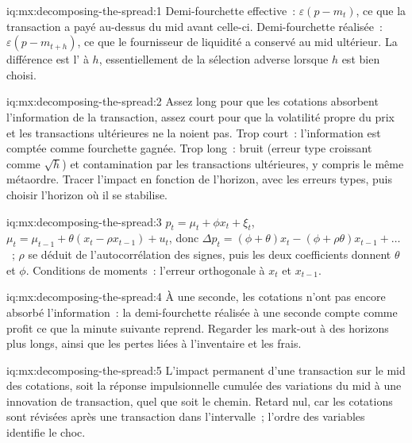 \begin{solution}{iq:mx:decomposing-the-spread:1}
Demi-fourchette effective~: $\varepsilon(p-m_t)$, ce que la transaction a payé au-dessus du mid avant celle-ci. Demi-fourchette réalisée~: $\varepsilon(p-m_{t+h})$, ce que le fournisseur de liquidité a conservé au mid ultérieur. La
différence est l' à $h$, essentiellement de la sélection adverse lorsque $h$ est bien choisi.
\end{solution}

\begin{solution}{iq:mx:decomposing-the-spread:2}
Assez long pour que les cotations absorbent l'information de la transaction, assez court pour que la volatilité propre du prix et les transactions ultérieures ne la noient pas. Trop court~:
l'information est comptée comme fourchette gagnée. Trop long~: bruit (erreur type croissant comme $\sqrt h$) et contamination par les transactions ultérieures, y compris le même
métaordre. Tracer l'impact en fonction de l'horizon, avec les erreurs types, puis choisir l'horizon où il se stabilise.
\end{solution}

\begin{solution}{iq:mx:decomposing-the-spread:3}
$p_t=\mu_t+\phi x_t+\xi_t$, $\mu_t=\mu_{t-1}+\theta(x_t-\rho x_{t-1})+u_t$, donc $\Delta p_t=(\phi+\theta)x_t-(\phi+\rho\theta)x_{t-1}+\dots$~; $\rho$ se déduit de
l'autocorrélation des signes, puis les deux coefficients donnent $\theta$ et $\phi$. Conditions de moments~: l'erreur orthogonale à $x_t$ et $x_{t-1}$.
\end{solution}

\begin{solution}{iq:mx:decomposing-the-spread:4}
À une seconde, les cotations n'ont pas encore absorbé l'information~: la demi-fourchette réalisée à une seconde compte comme profit ce que la minute suivante reprend. Regarder
les mark-out à des horizons plus longs, ainsi que les pertes liées à l'inventaire et les frais.
\end{solution}

\begin{solution}{iq:mx:decomposing-the-spread:5}
L'impact permanent d'une transaction sur le mid des cotations, soit la réponse impulsionnelle cumulée des variations du mid à une innovation de transaction, quel que soit le chemin. Retard
nul, car les cotations sont révisées après une transaction dans l'intervalle~; l'ordre des variables identifie le choc.
\end{solution}

